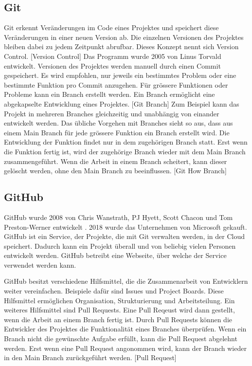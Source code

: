 \subsection{Git}
Git erkennt Veränderungen im Code eines Projektes und speichert diese
Veränderungen in einer neuen Version ab. Die einzelnen Versionen des Projektes
bleiben dabei zu jedem Zeitpunkt abrufbar. Dieses Konzept nennt sich Version
Control. [Version Control] Das Programm wurde 2005 von Linus Torvald entwickelt. 
Versionen des Projektes werden manuell durch einen Commit gespeichert. Es wird
empfohlen, nur jeweils ein bestimmtes Problem oder eine bestimmte Funktion pro
Commit anzugehen. Für grössere Funktionen oder Probleme kann ein Branch erstellt
werden. Ein Branch ermöglicht eine abgekapselte Entwicklung eines Projektes. [Git Branch] Zum
Beispiel kann das Projekt in mehreren Branches gleichzeitig und unabhängig von
einander entwickelt werden. Das übliche Vorgehen mit Branches sieht so aus, dass
aus einem Main Branch für jede grössere Funktion ein Branch erstellt wird.
Die Entwicklung der Funktion findet nur in dem zugehörigen Branch statt. Erst
wenn die Funktion fertig ist, wird der zugehörige Branch wieder mit dem Main
Branch zusammengeführt. Wenn die Arbeit in einem Branch scheitert, kann dieser
gelöscht werden, ohne den Main Branch zu beeinflussen. [Git How Branch]

\subsection{GitHub}
GitHub wurde 2008 von Chris Wanstrath, PJ Hyett, Scott Chacon und Tom
Preston-Werner entwickelt \cite{noauthor_github_2021}. 2018 wurde das
Unternehmen von Microsoft gekauft. GitHub ist ein Service, der Projekte, die mit
Git verwalten werden, in der Cloud speichert. Dadurch kann ein Projekt überall
und von beliebig vielen Personen entwickelt werden. GitHub betreibt eine
Webseite, über welche der Service verwendet werden kann.
\cite{noauthor_github_2021} 

GitHub besitzt verschiedene Hilfsmittel, die die Zusammenarbeit von Entwicklern
weiter vereinfachen. Beispiele dafür sind Issues und Project Boards. Diese
Hilfsmittel ermöglichen Organisation, Strukturierung und Arbeitsteilung. Ein
weiteres Hilfsmittel sind Pull Requests. Eine Pull Reqeust wird dann gestellt,
wenn die Arbeit an einem Branch fertig ist. Durch Pull Requests können die
Entwickler des Projektes die Funktionalität eines Branches überprüfen. Wenn ein
Branch nicht die gewünschte Aufgabe erfüllt, kann die Pull Request abgelehnt
werden. Erst wenn eine Pull Request angonommen wird, kann der Branch wieder in
den Main Branch zurückgeführt werden. [Pull Request]

